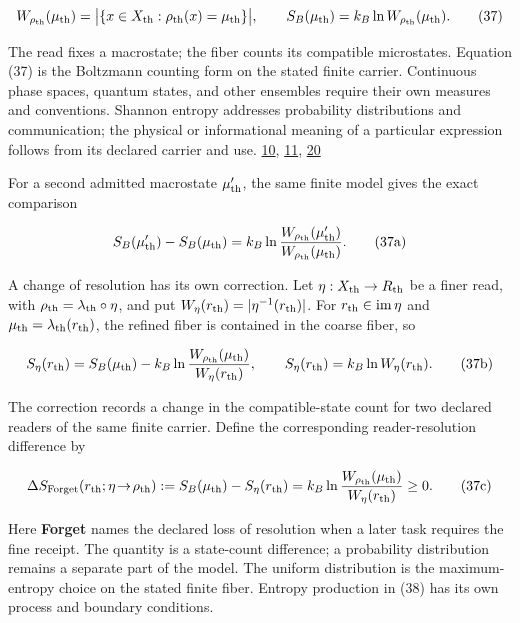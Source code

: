 \[
W_{\rho_{\rm th}}(\mu_{\rm th})
=\bigl|\{x\in X_{\rm th}:\rho_{\rm th}(x)=\mu_{\rm th}\}\bigr|,
\qquad
S_B(\mu_{\rm th})=k_B\ln W_{\rho_{\rm th}}(\mu_{\rm th}).
\tag{37}
\]

The read fixes a macrostate; the fiber counts its compatible microstates. Equation (37) is the Boltzmann counting form on the stated finite carrier. Continuous phase spaces, quantum states, and other ensembles require their own measures and conventions. Shannon entropy addresses probability distributions and communication; the physical or informational meaning of a particular expression follows from its declared carrier and use. \href{https://chatgpt.com/library?file_id=libfile_37ba8f1902d88191a1ecc5aa2a9514dd\&account_id=personal}{10}, \href{https://github.com/Coppalini-Architecture/coppalini-architecture/blob/9b7122ca5c3712c2c294e2bc5097276d0ba9817b/papers/10\%20THERMODYNAMICS_The_Typed_Root_of_Entropy_v0_2.md}{11}, \href{https://doi.org/10.1002/j.1538-7305.1948.tb01338.x}{20}

For a second admitted macrostate \(\mu'_{\rm th}\), the same finite model gives the exact comparison

\[
S_B(\mu'_{\rm th})-S_B(\mu_{\rm th})
=k_B\ln\frac{W_{\rho_{\rm th}}(\mu'_{\rm th})}{W_{\rho_{\rm th}}(\mu_{\rm th})}.
\tag{37a}
\]

A change of resolution has its own correction. Let \(\eta:X_{\rm th}\to R_{\rm th}\) be a finer read, with \(\rho_{\rm th}=\lambda_{\rm th}\circ\eta\), and put \(W_\eta(r_{\rm th})=|\eta^{-1}(r_{\rm th})|\). For \(r_{\rm th}\in\operatorname{im}\eta\) and \(\mu_{\rm th}=\lambda_{\rm th}(r_{\rm th})\), the refined fiber is contained in the coarse fiber, so

\[
S_\eta(r_{\rm th})=S_B(\mu_{\rm th})-k_B\ln\frac{W_{\rho_{\rm th}}(\mu_{\rm th})}{W_\eta(r_{\rm th})},
\qquad S_\eta(r_{\rm th})=k_B\ln W_\eta(r_{\rm th}).
\tag{37b}
\]

The correction records a change in the compatible-state count for two declared readers of the same finite carrier. Define the corresponding reader-resolution difference by

\[
\Delta S_{\rm Forget}(r_{\rm th};\eta\!\to\!\rho_{\rm th})
:=S_B(\mu_{\rm th})-S_\eta(r_{\rm th})
=k_B\ln\frac{W_{\rho_{\rm th}}(\mu_{\rm th})}{W_\eta(r_{\rm th})}
\geq0.
\tag{37c}
\]

Here \textbf{Forget} names the declared loss of resolution when a later task requires the fine receipt. The quantity is a state-count difference; a probability distribution remains a separate part of the model. The uniform distribution is the maximum-entropy choice on the stated finite fiber. Entropy production in (38) has its own process and boundary conditions.

